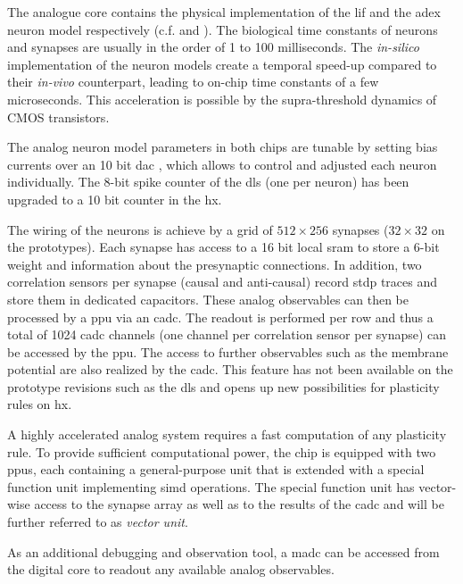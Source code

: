 The analogue core contains the physical implementation of the \gls{lif} and the \gls{adex} neuron model respectively (c.f. \cite{aamir2018dls2neuron} and \cite{aamir2018mixed}). The biological time constants of neurons and synapses are usually in the order of 1 to 100 milliseconds. The \textit{in-silico} implementation of the neuron models create a temporal speed-up compared to their \textit{in-vivo} counterpart, leading to on-chip time constants of a few microseconds. This acceleration is possible by the supra-threshold dynamics of CMOS transistors. 


The analog neuron model parameters in both chips are tunable by setting bias currents over an 10 bit \gls{dac} \cite{hock13analogmemory}, which allows to control and adjusted each neuron individually. The 8-bit spike counter of the \gls{dls} (one per neuron) has been upgraded to a 10 bit counter in the \gls{hx}. 

The wiring of the neurons is achieve by a grid of $512 \times 256$ synapses ($32 \times 32$ on the prototypes). Each synapse has access to a 16 bit local \gls{sram} to store a 6-bit weight and information about the presynaptic connections. In addition, two correlation sensors per synapse (causal and anti-causal) record \gls{stdp} traces and store them in dedicated capacitors. These analog observables can then be processed by a \gls{ppu} via an \gls{cadc}. The readout is performed per row and thus a total of 1024 \gls{cadc} channels (one channel per correlation sensor per synapse) can be accessed by the \gls{ppu}. The access to further observables such as the membrane potential are also realized by the \gls{cadc}. This feature has not been available on the prototype revisions such as the \gls{dls} and opens up new possibilities for plasticity rules on \gls{hx}.

A highly accelerated analog system requires a fast computation of any plasticity rule. To provide sufficient computational power, the chip is equipped with two \glspl{ppu}, each containing a general-purpose unit that is extended with a special function unit implementing \gls{simd} operations. The special function unit has vector-wise access to the synapse array as well as to the results of the \gls{cadc} and will be further referred to as \emph{vector unit}.

As an additional debugging and observation tool, a \gls{madc} can be accessed from the digital core to readout any available analog observables.

